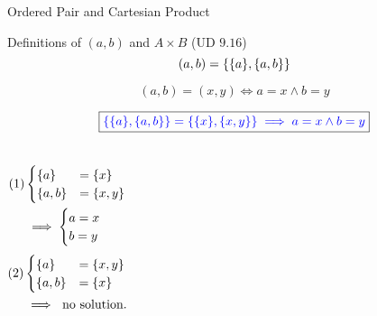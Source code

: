 \begin{frame}{}
  \centerline{\LARGE Ordered Pair and Cartesian Product}

  \vspace{0.60cm}
\end{frame}

\begin{frame}{}
  \begin{exampleblock}{Definitions of $(a,b)$ and $A \times B$ (UD $9.16$)}
    \[
      (a, b) = \{\{a\}, \{a,b\}\}
    \]

    \[
      (a,b) = (x,y) \iff a = x \land b = y
    \]
  \end{exampleblock}

  \pause
  \[
    \boxed{\textcolor{blue}{\{\{a\}, \{a,b\}\} = \{\{x\}, \{x,y\}\} \implies a = x \land b = y}}
  \]

  \pause
  \vspace{0.50cm}

  \begin{columns}
      \begin{align*}
	(1) &\begin{cases}
	  \{a\} &= \{x\} \\
	  \{a,b\} &= \{x,y\}
	\end{cases} \\
	&\implies \begin{cases}
	    a = x \\
	    b = y
	  \end{cases}
      \end{align*}
      \begin{align*}
	(2) &\begin{cases}
	  \{a\} &= \{x,y\} \\
	  \{a,b\} &= \{x\}
	\end{cases} \\
	&\implies \text{ no solution.}
      \end{align*}
  \end{columns}
\end{frame}

